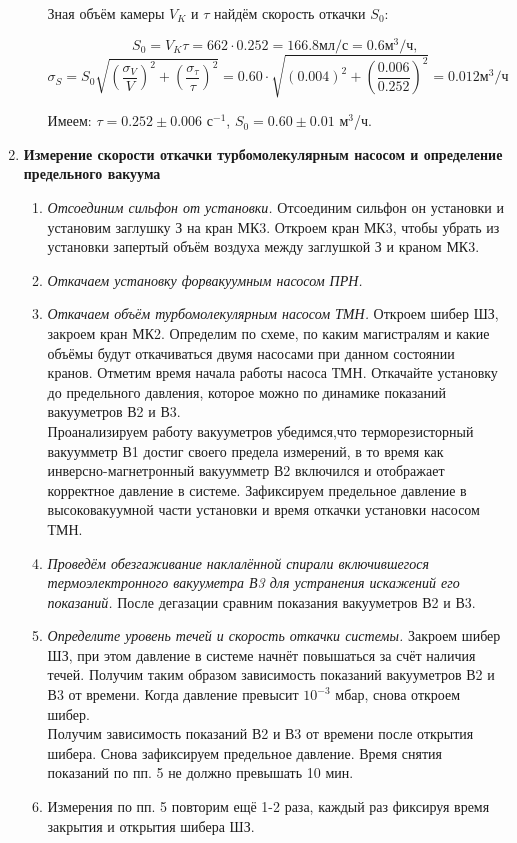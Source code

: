 \documentclass[a4paper,12pt]{article}
\begin{document}
\begin{enumerate}
\begin{enumerate}
Зная объём камеры $V_K$ и $\tau$ найдём скорость откачки $S_0$:

\[
S_0 = V_K \tau = 662 \cdot 0.252 = 166.8 \text{мл/с} = 0.6 \text{м}^3/\text{ч}, 
\]
\[
\sigma_S = S_0 \sqrt{\left( \frac{\sigma_V}{V} \right)^2 + \left( \frac{\sigma_\tau}{\tau} \right)^2} = 0.60 \cdot \sqrt{\left( 0.004 \right)^2 + \left( \frac{0.006}{0.252} \right)^2} = 0.012 \text{м}^3/\text{ч}
\]

Имеем: $\tau = 0.252 \pm 0.006$ с$^{-1}$, $S_0 = 0.60 \pm 0.01$ м$^3$/ч.
	
\end{enumerate}

\item \textbf{Измерение скорости откачки турбомолекулярным насосом и определение предельного вакуума}
\begin{enumerate}
	\item \textit{Отсоединим сильфон от установки.} Отсоединим сильфон он установки и установим заглушку З на кран МК3. Откроем кран МК3, чтобы убрать из установки запертый объём воздуха между заглушкой З и краном МК3.
	\item \textit{Откачаем установку форвакуумным насосом ПРН.}
	\item \textit{Откачаем объём турбомолекулярным насосом ТМН.} Откроем  шибер ШЗ,  закроем  кран МК2.  Определим  по схеме, по каким магистралям и какие объёмы будут откачиваться двумя насосами при данном состоянии кранов. Отметим время начала работы насоса ТМН. Откачайте  установку  до  предельного  давления,  которое  можно по динамике показаний вакууметров В2 и В3. \\
	Проанализируем работу вакууметров убедимся,что терморезисторный  вакуумметр В1  достиг  своего  предела  измерений, в то время как инверсно-магнетронный вакуумметр В2 включился и отображает  корректное  давление  в системе.  Зафиксируем  предельное  давление в высоковакуумной части установки и время откачки установки насосом ТМН. 
	\item \textit{Проведём обезгаживание наклалённой спирали включившегося термоэлектронного вакууметра В3 для устранения искажений его показаний.} После дегазации сравним показания вакууметров В2 и В3.
	\item \textit{Определите уровень течей и скорость откачки системы.} Закроем  шибер  ШЗ,  при  этом  давление  в  системе  начнёт  повышаться за счёт наличия течей. Получим таким образом зависимость показаний вакууметров В2 и В3 от времени. Когда давление превысит $10^{-3}$ мбар, снова откроем шибер. \\ 
	Получим зависимость показаний В2 и В3 от времени после открытия шибера. Снова зафиксируем предельное давление. Время снятия показаний по пп. 5 не должно превышать 10 мин.
	\item Измерения  по пп. 5  повторим  ещё 1-2  раза,  каждый  раз  фиксируя время закрытия и открытия шибера ШЗ. 
	

\end{enumerate}
\end{enumerate}
\end{document}
